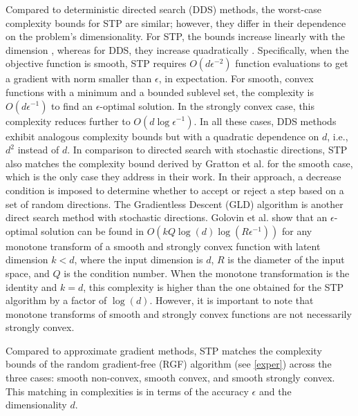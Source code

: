 \documentclass{article} %
\begin{document}
Compared to deterministic directed search (DDS) methods, the worst-case complexity bounds for STP are similar; however, they differ in their dependence on the problem's dimensionality. For STP, the bounds increase linearly with the dimension \citep{bergou2020stochastic}, whereas for DDS, they increase quadratically \citep{konevcny2014simple,vicente2013worst}. Specifically, when the objective function is smooth, STP requires \( O(d \epsilon^{-2}) \) function evaluations to get a gradient with norm smaller than \( \epsilon \), in expectation. For smooth, convex functions with a minimum and a bounded sublevel set, the complexity is \( O(d \epsilon^{-1}) \) to find an \( \epsilon\)-optimal solution. In the strongly convex case, this complexity reduces further to \( O(d \log \epsilon^{-1}) \). In all these cases, DDS methods exhibit analogous complexity bounds but with a quadratic dependence on \( d \), i.e., \( d^2 \) instead of \( d \). 
In comparison to directed search with stochastic directions, STP also matches the complexity bound derived by Gratton et al. \citep{doi:10.1137/140961602} for the smooth case, which is the only case they address in their work. In their approach, a decrease condition is imposed to determine whether to accept or reject a step based on a set of random directions. The Gradientless Descent (GLD) algorithm \citep{golovin2019gradientless} is another direct search method with stochastic directions. Golovin et al. show that an $\epsilon$-optimal solution can be found in $O(kQ \log(d) \log\left(R \epsilon^{-1}\right))$ for any monotone transform of a smooth and strongly convex function with latent dimension $k < d$, where the input dimension is $d$, $R$ is the diameter of the input space, and $Q$ is the condition number. When the monotone transformation is the identity and $k = d$, this complexity is higher than the one obtained for the STP algorithm by a factor of $\log(d)$. However, it is important to note that monotone transforms of smooth and strongly convex functions are not necessarily strongly convex.

Compared to approximate gradient methods, STP matches the complexity bounds of the random gradient-free (RGF) 
algorithm \citep{nesterov2017random} (see \cref{exper}) across the three cases: smooth non-convex, smooth convex, and smooth strongly convex. 
This matching in complexities is in terms of the accuracy $\epsilon$ and the dimensionality $d$.  %
\end{document}
